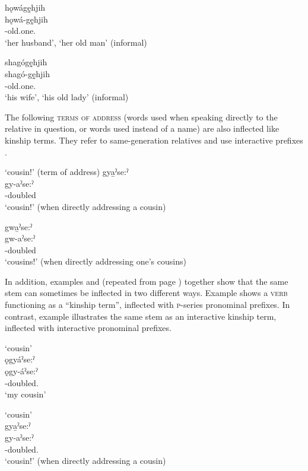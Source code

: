 \ex hǫwágę̱hjih \\
\gll  hǫwá-gę̱hjih\\
-old.one.{\stative}\\
\glt  ‘her husband’, ‘her old man’ (informal)

\ex shagógę̱hjih \\
\gll  shagó-gę̱hjih\\
-old.one.{\stative}\\
\glt  ‘his wife’, ‘his old lady’ (informal)
\z
\z

The following \textsc{terms of address} (words used when speaking directly to the relative in question, or words used instead of a name) are also inflected like kinship terms. They refer to same-generation relatives and use interactive prefixes . 

\ea\label{ex:termaddppex7}  ‘cousin!’ (term of address)
\ea gya̱ˀse:ˀ\\
\gll gy-aˀse:ˀ\\
-doubled\\
\glt ‘cousin!’ (when directly addressing a cousin)

\ex gwa̱ˀse:ˀ\\
\gll gw-aˀse:ˀ\\
-doubled\\
\glt ‘cousins!’ (when directly addressing one’s cousins)
\z
\z

In addition, examples  and  (repeated from page \pageref{ex:kintermppex8}) together show that the same stem can sometimes be inflected in two different ways. Example  shows a \textsc{verb} functioning as a “kinship term”, inflected with \textsc{p}-series pronominal prefixes. In contrast, example  illustrates the same stem as an interactive kinship term, inflected with interactive pronominal prefixes.

\ea\label{ex:twotypes2} 
\ea\label{ex:twotypes2a}  ‘cousin’ \\
\glll ǫgyáˀse:ˀ \\
ǫgy-áˀse:ˀ\\
 {\wetwo}-doubled.{\stative} \\
\glt `my cousin'

\ex {} ‘cousin’ \\\label{ex:twotypes2b}
\glll gya̱ˀse:ˀ \\
gy-aˀse:ˀ \\
-doubled.{\stative} \\
\glt ‘cousin!’ (when directly addressing a cousin)
\z
\z


